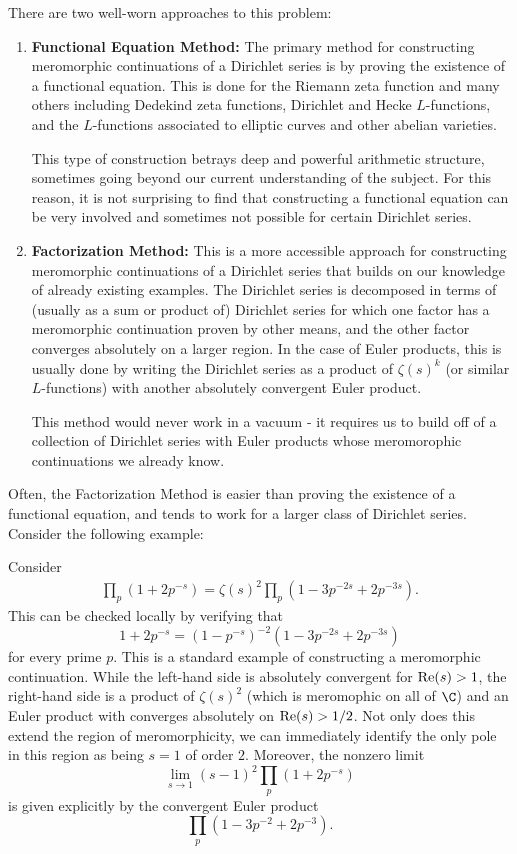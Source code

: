 \documentclass[12pt]{amsart}
\newenvironment{BOXexample}{
\begin{exbox}\mbox{}
\begin{example}
}
{
\end{example}
\end{exbox}
}
\theoremstyle{plain}
\begin{document}
There are two well-worn approaches to this problem:
\begin{enumerate}
\item \textbf{Functional Equation Method:} The primary method for constructing meromorphic continuations of a Dirichlet series is by proving the existence of a functional equation. This is done for the Riemann zeta function and many others including Dedekind zeta functions, Dirichlet and Hecke $L$-functions, and the $L$-functions associated to elliptic curves and other abelian varieties.

This type of construction betrays deep and powerful arithmetic structure, sometimes going beyond our current understanding of the subject. For this reason, it is not surprising to find that constructing a functional equation can be very involved and sometimes not possible for certain Dirichlet series.

\item \textbf{Factorization Method:} This is a more accessible approach for constructing meromorphic continuations of a Dirichlet series that builds on our knowledge of already existing examples. The Dirichlet series is decomposed in terms of (usually as a sum or product of) Dirichlet series for which one factor has a meromorphic continuation proven by other means, and the other factor converges absolutely on a larger region. In the case of Euler products, this is usually done by writing the Dirichlet series as a product of $\zeta(s)^k$ (or similar $L$-functions) with another absolutely convergent Euler product.

This method would never work in a vacuum - it requires us to build off of a collection of Dirichlet series with Euler products whose meromorophic continuations we already know.
\end{enumerate}

Often, the Factorization Method is easier than proving the existence of a functional equation, and tends to work for a larger class of Dirichlet series. Consider the following example:

\begin{BOXexample}\label{ex:intro}
Consider
\begin{align*}
    \prod_p (1 + 2p^{-s}) = \zeta(s)^2 \prod_p (1 - 3p^{-2s} + 2p^{-3s}).
\end{align*}
This can be checked locally by verifying that
\[
1+2p^{-s} = (1 - p^{-s})^{-2}(1 - 3p^{-2s}+2p^{-3s})
\]
for every prime $p$. This is a standard example of constructing a meromorphic continuation. While the left-hand side is absolutely convergent for ${\rm Re}(s) > 1$, the right-hand side is a product of $\zeta(s)^2$ (which is meromophic on all of $\C$) and an Euler product with converges absolutely on ${\rm Re}(s) > 1/2$. Not only does this extend the region of meromorphicity, we can immediately identify the only pole in this region as being $s=1$ of order $2$. Moreover, the nonzero limit
\[
\lim_{s\to 1} (s-1)^2\prod_p (1 + 2p^{-s})
\]
is given explicitly by the convergent Euler product
\[
\prod_p (1 - 3p^{-2} + 2p^{-3}).
\]
\end{BOXexample}
\end{document}

